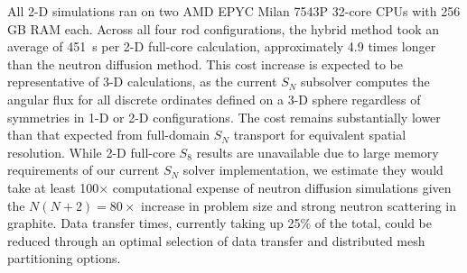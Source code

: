 All 2-D simulations ran on two AMD EPYC Milan 7543P 32-core CPUs with 256 GB RAM each.
Across all four rod configurations, the hybrid method took an average of
451~s per 2-D full-core calculation, approximately 4.9 times longer than the neutron diffusion
method. This cost increase is expected to be representative of 3-D
calculations, as the current $S_N$ subsolver computes the angular flux for all discrete ordinates
defined on a 3-D sphere regardless of symmetries in 1-D or 2-D configurations. 
The cost remains substantially lower than that expected from full-domain $S_N$ transport for
equivalent spatial resolution. While 2-D full-core $S_8$ results are unavailable due to large
memory requirements of our current $S_N$ solver implementation, we estimate
they would take at least 100$\times$ computational expense of neutron diffusion
simulations given the $N\left(N+2\right)=80\times$ increase in problem size and strong neutron
scattering in graphite.
Data transfer times, currently taking up 25\% of the total, could be reduced through an optimal
selection of data transfer and distributed mesh partitioning options.
